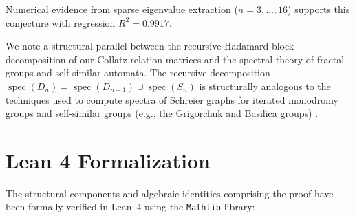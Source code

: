 \documentclass[11pt,reqno]{amsart}
\theoremstyle{definition}
\begin{document}
Numerical evidence from sparse eigenvalue extraction ($n = 3, \ldots, 16$) supports this conjecture with regression $R^2 = 0.9917$.

We note a structural parallel between the recursive Hadamard block decomposition of our Collatz relation matrices and the spectral theory of fractal groups and self-similar automata. The recursive decomposition $\operatorname{spec}(D_n) = \operatorname{spec}(D_{n-1}) \cup \operatorname{spec}(S_n)$ is structurally analogous to the techniques used to compute spectra of Schreier graphs for iterated monodromy groups and self-similar groups (e.g., the Grigorchuk and Basilica groups) \cite{bartholdi2003, nekrashevych2005}.

\section{Lean 4 Formalization}

The structural components and algebraic identities comprising the proof have been formally verified in Lean~4 using the \texttt{Mathlib} library:
\end{document}
